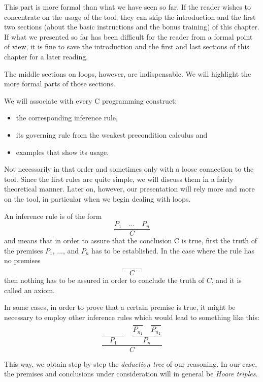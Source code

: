 \begin{Information}
  This part is more formal than what we have seen so far. If the reader
  wishes to concentrate on the usage of the tool, they can skip the
  introduction and the first two sections (about the basic instructions
  and the bonus training) of this chapter. If what we presented so far has
  been difficult for the reader from a formal point of view,
  it is fine to save the introduction and 
  the first and last sections of this chapter for a later reading.

  The middle sections on loops, however, are indispensable. We will highlight
  the more formal parts of those sections.
\end{Information}


We will associate with every C programming construct:
\begin{itemize}
\item the corresponding inference rule,
\item its governing rule from the weakest precondition calculus and
\item examples that show its usage.
\end{itemize}

Not necessarily in that order and sometimes only with a loose connection
to the tool. Since the first rules are quite simple, we will discuss
them in a fairly theoretical manner. Later on, however, our presentation
will rely more and more on the tool, in particular when we begin dealing
with loops.





An inference rule is of the form
$$\dfrac{P_1 \quad ... \quad P_n}{C}$$
and means that in order to assure that the conclusion C is true, first
the truth of the premises $P_1$, ..., and $P_n$ has to be
established. In the case where the rule has no premises
$$\dfrac{}{\quad C \quad}$$
then nothing has to be assured in order to conclude the truth of $C$,
and it is called an axiom.

In some cases, in order to prove that a certain premise is true, it
might be necessary to employ other inference rules which would lead to
something like this:
$$\dfrac{\dfrac{}{\quad P_1\quad} \quad \dfrac{\dfrac{}{P_{n_1}}\quad \dfrac{}{P_{n_2}}}{P_n}}{C}$$

This way, we obtain step by step the \emph{deduction tree} of our
reasoning. In our case, the premises and conclusions under consideration
will in general be \emph{Hoare triples}.



